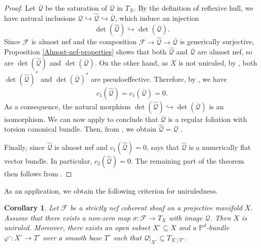 \documentclass[english,reqno]{amsart}
\newcommand\sF{{\mathscr F}}
\newcommand\sQ{{\mathscr Q}}
\theoremstyle{plain}
\newtheorem{cor}[thm]{Corollary}
\theoremstyle{definition}
\numberwithin{equation}{section} %
\begin{document}
\begin{proof}
    Let $\overline{\sQ}$ be the saturation of $\sQ$ in $T_X$. By the definition of reflexive hull, we have  natural inclusions $\sQ\hookrightarrow\widehat{\sQ}\hookrightarrow\overline{\sQ}$, which induce  an injection
    \begin{equation}\label{Eq-determinants}
     \det(\widehat{\sQ})\hookrightarrow\det(\overline{\sQ}).
    \end{equation}
    Since $\sF$ is almost nef and the composition $\sF\rightarrow \widehat{\sQ}\rightarrow \overline{\sQ}$ is generically surjective, Proposition \ref{Almost-nef-properties} shows that   both $\widehat{\sQ}$ and $\overline{\sQ}$ are almost nef, so are $\det(\widehat{\sQ})$ and $\det(\overline{\sQ})$.   On the other hand, as $X$ is not uniruled, by \cite[Theorem 2.6]{BoucksomDemaillyPuaunPeternell2013}, both $\det(\widehat{\sQ})^*$ and $\det(\overline{\sQ})^*$ are pseudoeffective. Therefore, by  \cite[Lemma 6.5]{Peternell1994}, we have 
    \[
    c_1(\widehat{\sQ})= c_1(\overline{\sQ})=0.
    \]
    As a consequence, the natural morphism $\det(\widehat{\sQ})\hookrightarrow\det(\overline{\sQ})$ is  an isomorphism.   We can now apply \cite[Theorem 5.2]{LorayPereiraTouzet2018} to conclude that $\overline{\sQ}$ is a regular foliation  with torsion canonical bundle. Then, from \cite[Lemma 1.20]{DemaillyPeternellSchneider1994}, we obtain  $\widehat{\sQ} = \overline{\sQ}$ .

    Finally, since $\widehat{\sQ}$ is almost nef and $c_1(\widehat{\sQ})=0$, \cite[Theorem 1.8]{HoeringPeternell2019} says that $\widehat{\sQ}$ is a numerically flat vector bundle. In particular,  $c_2(\widehat{\sQ})=0$.  The remaining part of the theorem then follows from   \cite[Theorem C]{PereiraTouzet2013}.
\end{proof}

As an application, we obtain the following criterion for uniruledness.

\begin{cor}\label{Uniruledness}
    Let $\sF$ be a strictly nef coherent sheaf on a projective manifold $X$. Assume that there exists a non-zero map $\sigma\colon\sF\rightarrow T_X$ with image $\sQ$. Then $X$ is uniruled. Moreover, there exists an open subset $X^\circ\subseteq X$ and a $\mathbb{P}^d$-bundle $\varphi^\circ\colon X^\circ\rightarrow T^\circ$ over a smooth base $T^\circ$ such that $\sQ\vert_{X^\circ}\subseteq T_{X^\circ/T^\circ}$.
\end{cor}
\end{document}

